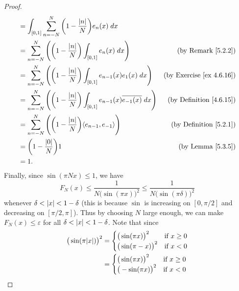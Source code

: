 \begin{proof}
\begin{align*}
         & = \int_{[0, 1]} \sum_{n = -N}^N \bigg(1 - \frac{\abs{n}}{N}\bigg) e_n(x) \; dx                                                                               \\
         & = \sum_{n = -N}^N \Bigg(\bigg(1 - \frac{\abs{n}}{N}\bigg) \int_{[0, 1]} e_n(x) \; dx\Bigg)                            & \text{(by Remark \ref{5.2.2})}       \\
         & = \sum_{n = -N}^N \Bigg(\bigg(1 - \frac{\abs{n}}{N}\bigg) \int_{[0, 1]} e_{n - 1}(x) e_1(x) \; dx\Bigg)               & \text{(by Exercise \ref{ex 4.6.16})} \\
         & = \sum_{n = -N}^N \Bigg(\bigg(1 - \frac{\abs{n}}{N}\bigg) \int_{[0, 1]} e_{n - 1}(x) \overline{e_{-1}(x)} \; dx\Bigg) & \text{(by Definition \ref{4.6.15})}  \\
         & = \sum_{n = -N}^N \Bigg(\bigg(1 - \frac{\abs{n}}{N}\bigg) \inner*{e_{n - 1}, e_{-1}}\Bigg)                            & \text{(by Definition \ref{5.2.1})}   \\
         & = \bigg(1 - \frac{\abs{0}}{N}\bigg) 1                                                                                 & \text{(by Lemma \ref{5.3.5})}        \\
         & = 1.
    \end{align*}
    Finally, since \(\sin(\pi N x) \leq 1\), we have
    \[
        F_N(x) \leq \frac{1}{N \big(\sin(\pi x)\big)^2} \leq \frac{1}{N \big(\sin(\pi \delta)\big)^2}
    \]
    whenever \(\delta < \left\lvert x\right\rvert < 1 - \delta\)
    (this is because \(\sin\) is increasing on \([0, \pi / 2]\) and decreasing on \([\pi / 2, \pi]\)).
    Thus by choosing \(N\) large enough, we can make \(F_N (x) \leq \varepsilon\) for all \(\delta < \left\lvert x\right\rvert < 1 - \delta\).
    Note that since
    \begin{align*}
        \big(\sin(\pi \abs{x})\big)^2 & = \begin{cases}
                                              \big(\sin(\pi x)\big)^2  & \text{if } x \geq 0 \\
                                              \big(\sin(\pi -x)\big)^2 & \text{if } x < 0
                                          \end{cases} \\
                                      & = \begin{cases}
                                              \big(\sin(\pi x)\big)^2  & \text{if } x \geq 0 \\
                                              \big(-\sin(\pi x)\big)^2 & \text{if } x < 0

\end{cases}
\end{align*}
\end{proof}
